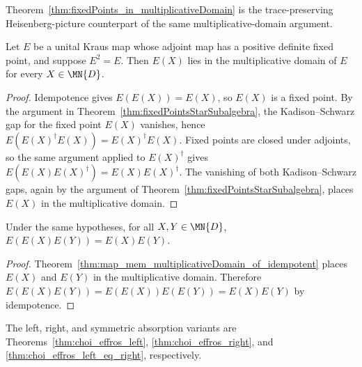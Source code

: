 \begin{remark}\leanok
    Theorem~\ref{thm:fixedPoints_in_multiplicativeDomain} is the
    trace-preserving Heisenberg-picture counterpart of the same
    multiplicative-domain argument.
\end{remark}

\begin{theorem}
    \label{thm:map_mem_multiplicativeDomain_of_idempotent}
    \leanok
    Let $E$ be a unital Kraus map whose adjoint map has a positive definite
    fixed point, and suppose $E^2=E$. Then $E(X)$ lies in the multiplicative
    domain of $E$ for every $X\in\MN{D}$.
\end{theorem}

\begin{proof}\leanok
    Idempotence gives $E(E(X))=E(X)$, so $E(X)$ is a fixed point.
    By the argument in Theorem~\ref{thm:fixedPointsStarSubalgebra}, the
    Kadison--Schwarz gap for the fixed point $E(X)$ vanishes, hence
    $E(E(X)^\dagger E(X))=E(X)^\dagger E(X)$.
    Fixed points are closed under adjoints, so the same argument applied to
    $E(X)^\dagger$ gives
    $E(E(X)E(X)^\dagger)=E(X)E(X)^\dagger$.
    The vanishing of both Kadison--Schwarz gaps, again by the argument of
    Theorem~\ref{thm:fixedPointsStarSubalgebra}, places $E(X)$ in the
    multiplicative domain.
\end{proof}

\begin{theorem}
    \label{thm:choi_effros_sandwich}
    \leanok
    Under the same hypotheses, for all $X,Y\in\MN{D}$,
    $E(E(X)E(Y))=E(X)E(Y)$.
\end{theorem}

\begin{proof}\leanok
    Theorem~\ref{thm:map_mem_multiplicativeDomain_of_idempotent} places
    $E(X)$ and $E(Y)$ in the multiplicative domain. Therefore
    $E(E(X)E(Y))=E(E(X))E(E(Y))=E(X)E(Y)$ by idempotence.
\end{proof}

The left, right, and symmetric absorption variants are
Theorems~\ref{thm:choi_effros_left}, \ref{thm:choi_effros_right}, and
\ref{thm:choi_effros_left_eq_right}, respectively.

